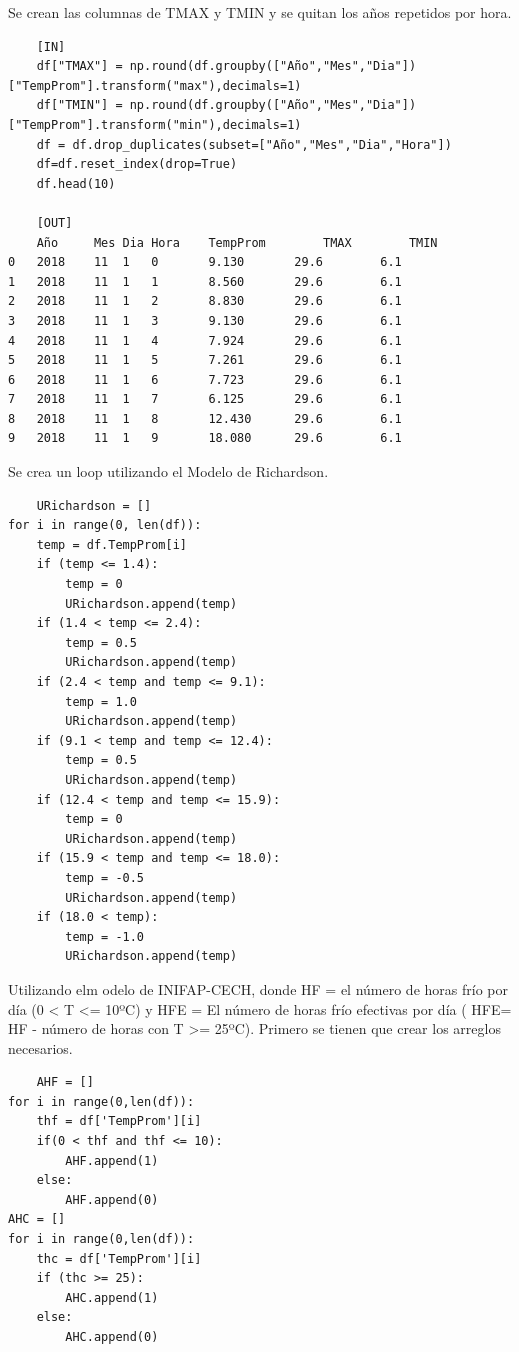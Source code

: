 \documentclass[11pt, spanish]{report}
\begin{document}
Se crean las columnas de TMAX y TMIN y se quitan los años repetidos por hora.
\begin{verbatim}
    [IN]
    df["TMAX"] = np.round(df.groupby(["Año","Mes","Dia"])["TempProm"].transform("max"),decimals=1)
    df["TMIN"] = np.round(df.groupby(["Año","Mes","Dia"])["TempProm"].transform("min"),decimals=1)
    df = df.drop_duplicates(subset=["Año","Mes","Dia","Hora"])
    df=df.reset_index(drop=True)
    df.head(10)
    
    [OUT]
    Año     Mes	Dia Hora	TempProm	    TMAX	    TMIN
0   2018    11  1   0       9.130	    29.6	    6.1
1   2018    11  1   1       8.560	    29.6	    6.1
2   2018    11  1   2       8.830	    29.6	    6.1
3   2018    11  1   3       9.130	    29.6	    6.1
4   2018    11  1   4       7.924	    29.6	    6.1
5   2018    11  1   5       7.261	    29.6	    6.1
6   2018    11  1   6       7.723	    29.6	    6.1
7   2018    11  1   7       6.125	    29.6	    6.1
8   2018    11  1   8       12.430	    29.6	    6.1
9   2018    11  1   9       18.080	    29.6	    6.1
\end{verbatim}
Se crea un loop utilizando el Modelo de Richardson.
\begin{verbatim}
    URichardson = []
for i in range(0, len(df)):
    temp = df.TempProm[i]
    if (temp <= 1.4):
        temp = 0
        URichardson.append(temp)
    if (1.4 < temp <= 2.4):
        temp = 0.5
        URichardson.append(temp)
    if (2.4 < temp and temp <= 9.1):
        temp = 1.0
        URichardson.append(temp)
    if (9.1 < temp and temp <= 12.4):
        temp = 0.5
        URichardson.append(temp)
    if (12.4 < temp and temp <= 15.9):
        temp = 0
        URichardson.append(temp)
    if (15.9 < temp and temp <= 18.0):
        temp = -0.5
        URichardson.append(temp)
    if (18.0 < temp):
        temp = -1.0
        URichardson.append(temp)
\end{verbatim}
Utilizando elm odelo de INIFAP-CECH, donde HF = el número de horas frío por día (0 < T <= 10ºC) y HFE = El número de horas frío efectivas por día ( HFE= HF - número de horas con T >= 25ºC). Primero se tienen que crear los arreglos necesarios.
\begin{verbatim}
    AHF = []
for i in range(0,len(df)):
    thf = df['TempProm'][i]
    if(0 < thf and thf <= 10):
        AHF.append(1)
    else:
        AHF.append(0)
AHC = []
for i in range(0,len(df)):
    thc = df['TempProm'][i]
    if (thc >= 25):
        AHC.append(1)
    else:
        AHC.append(0)
\end{verbatim}
\end{document}
